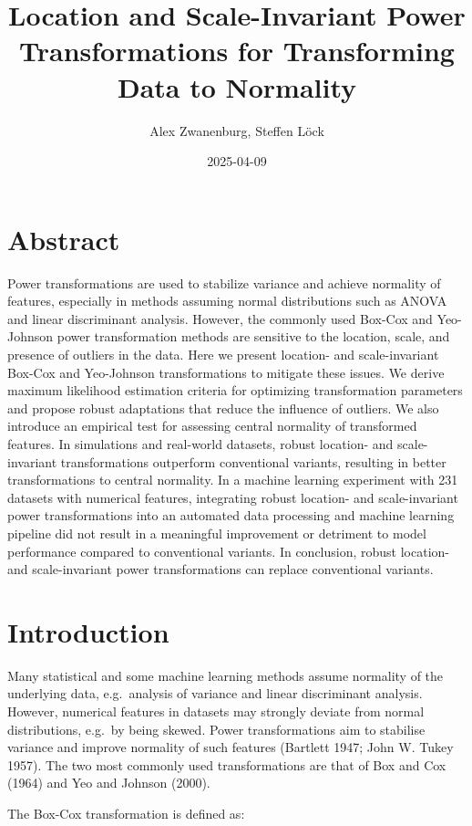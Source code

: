 \documentclass[
  a4paper,
]{article}
\title{Location and Scale-Invariant Power Transformations for
Transforming Data to Normality}
\author{Alex Zwanenburg, Steffen Löck}
\date{2025-04-09}
\begin{document}
\maketitle

\section{Abstract}\label{abstract}

Power transformations are used to stabilize variance and achieve
normality of features, especially in methods assuming normal
distributions such as ANOVA and linear discriminant analysis. However,
the commonly used Box-Cox and Yeo-Johnson power transformation methods
are sensitive to the location, scale, and presence of outliers in the
data. Here we present location- and scale-invariant Box-Cox and
Yeo-Johnson transformations to mitigate these issues. We derive maximum
likelihood estimation criteria for optimizing transformation parameters
and propose robust adaptations that reduce the influence of outliers. We
also introduce an empirical test for assessing central normality of
transformed features. In simulations and real-world datasets, robust
location- and scale-invariant transformations outperform conventional
variants, resulting in better transformations to central normality. In a
machine learning experiment with 231 datasets with numerical features,
integrating robust location- and scale-invariant power transformations
into an automated data processing and machine learning pipeline did not
result in a meaningful improvement or detriment to model performance
compared to conventional variants. In conclusion, robust location- and
scale-invariant power transformations can replace conventional variants.

\section{Introduction}\label{introduction}

Many statistical and some machine learning methods assume normality of
the underlying data, e.g.~analysis of variance and linear discriminant
analysis. However, numerical features in datasets may strongly deviate
from normal distributions, e.g.~by being skewed. Power transformations
aim to stabilise variance and improve normality of such features
(Bartlett 1947; John W. Tukey 1957). The two most commonly used
transformations are that of Box and Cox (1964) and Yeo and Johnson
(2000).

The Box-Cox transformation is defined as:
\end{document}
